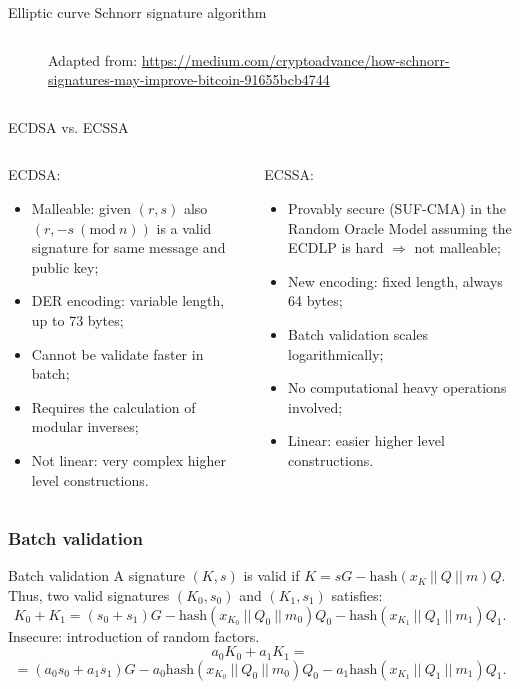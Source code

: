 \documentclass[slidescentered]{beamer}
\newcommand{\source}[1]{\caption*{\tiny Adapted from: {#1}} }
\begin{document}
\begin{frame}{Elliptic curve Schnorr signature algorithm}
\begin{columns}
\begin{column}{0.5\linewidth}
\begin{figure}
{						\source{\tiny \url{https://medium.com/cryptoadvance/how-schnorr-signatures-may-improve-bitcoin-91655bcb4744}}}
				\end{figure}
			\end{column}
		\end{columns}
	\end{frame}

	\begin{frame}{ECDSA vs. ECSSA}
		\begin{columns}
			\begin{column}{0.5\linewidth}
				ECDSA:
				\begin{itemize}
					\item<2 -> Malleable: given $(r, s)$ also $(r, -s \ (\text{mod} \ n))$ is a valid signature for same message and public key;
					\item<3 -> DER encoding: variable length, up to 73 bytes;
					\item<4 -> Cannot be validate faster in batch;
					\item<5 -> Requires the calculation of modular inverses;
					\item<6 -> Not linear: very complex higher level constructions.
				\end{itemize}
			\end{column}
			\begin{column}{0.5\linewidth}
				ECSSA:
				\begin{itemize}
					\item<2 -> Provably secure (SUF-CMA) in the Random Oracle Model assuming the ECDLP is hard $\Longrightarrow$ not malleable;
					\item<3 -> New encoding: fixed length, always 64 bytes;
					\item<4 -> Batch validation scales logarithmically;
					\item<5 -> No computational heavy operations involved;
					\item<6 -> Linear: easier higher level constructions.
				\end{itemize}
			\end{column}
		\end{columns}
	\end{frame}

	\subsubsection{Batch validation}
	\begin{frame}{Batch validation}
		A signature $(K, s)$ is valid if $K = sG - \text{hash}(x_K \ || \ Q \ || \ m)Q$. Thus, two valid signatures $(K_0, s_0)$ and $(K_1, s_1)$ satisfies:
		$$K_0 + K_1 = (s_0 + s_1)G - \text{hash}(x_{K_0} \ || \ Q_0 \ || \ m_0)Q_0 - \text{hash}(x_{K_1} \ || \ Q_1 \ || \ m_1)Q_1.$$
		Insecure: introduction of random factors.
		$$a_0K_0 + a_1K_1 =$$ $$
		= (a_0s_0 + a_1s_1)G - a_0\text{hash}(x_{K_0} \ || \ Q_0 \ || \ m_0)Q_0 - a_1\text{hash}(x_{K_1} \ || \ Q_1 \ || \ m_1)Q_1.$$
	\end{frame}
\end{document}

